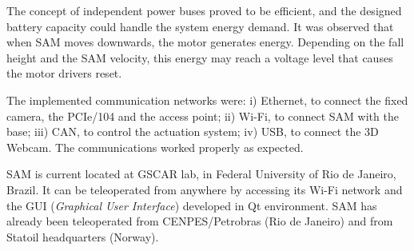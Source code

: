 \documentclass{ifacconf}
\begin{document}
The concept of independent power buses proved to be efficient, and the designed battery capacity could handle the system energy demand. It was observed that when SAM moves downwards, the motor generates energy. Depending on
the fall height and the SAM velocity, this energy may reach a voltage level that causes the motor drivers reset.

The implemented communication networks were: i) Ethernet, to connect the fixed camera, the PCIe/104 and the access point; ii) Wi-Fi, to connect SAM with the base; iii) CAN, to control the actuation system; iv) USB, to connect the 3D Webcam. The communications worked properly as expected.

SAM is current located at GSCAR lab, in Federal University of Rio de Janeiro, Brazil. It can be teleoperated from anywhere by accessing its Wi-Fi network and the GUI (\emph{Graphical User Interface}) developed in Qt environment. SAM has already been teleoperated from CENPES/Petrobras (Rio de Janeiro) and from Statoil headquarters (Norway).
\end{document}

